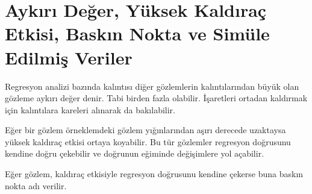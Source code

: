 \documentclass[
]{book}
\begin{document}
\hypertarget{aykux131rux131-deux11fer-yuxfcksek-kaldux131rauxe7-etkisi-baskux131n-nokta-ve-simuxfcle-edilmiux15f-veriler}{%
\section{Aykırı Değer, Yüksek Kaldıraç Etkisi, Baskın Nokta ve Simüle Edilmiş Veriler}\label{aykux131rux131-deux11fer-yuxfcksek-kaldux131rauxe7-etkisi-baskux131n-nokta-ve-simuxfcle-edilmiux15f-veriler}}

Regresyon analizi bazında kalıntısı diğer gözlemlerin kalıntılarından büyük olan gözleme aykırı değer denir. Tabi birden fazla olabilir. İşaretleri ortadan kaldırmak için kalıntılara kareleri alınarak da bakılabilir.

Eğer bir gözlem örneklemdeki gözlem yığınlarından aşırı derecede uzaktaysa yüksek kaldıraç etkisi ortaya koyabilir. Bu tür gözlemler regresyon doğrusunu kendine doğru çekebilir ve doğrunun eğiminde değişimlere yol açabilir.

Eğer gözlem, kaldıraç etkisiyle regresyon doğrusunu kendine çekerse buna baskın nokta adı verilir.
\end{document}
